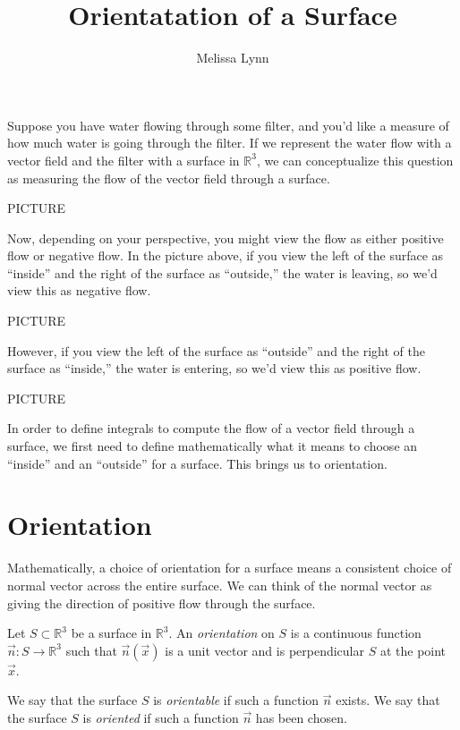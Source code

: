 \documentclass{ximera}
\title{Orientatation of a Surface}
\author{Melissa Lynn}
\begin{document}
  
\begin{abstract}  
\end{abstract}  
\maketitle  

Suppose you have water flowing through some filter, and you'd like a measure of how much water is going through the filter. If we represent the water flow with a vector field and the filter with a surface in $\mathbb{R}^3$, we can conceptualize this question as measuring the flow of the vector field through a surface.

PICTURE

Now, depending on your perspective, you might view the flow as either positive flow or negative flow. In the picture above, if you view the left of the surface as ``inside'' and the right of the surface as ``outside,'' the water is leaving, so we'd view this as negative flow.

PICTURE

However, if you view the left of the surface as ``outside'' and the right of the surface as ``inside,'' the water is entering, so we'd view this as positive flow.

PICTURE

In order to define integrals to compute the flow of a vector field through a surface, we first need to define mathematically what it means to choose an ``inside'' and an ``outside'' for a surface. This brings us to orientation.

\section*{Orientation}

Mathematically, a choice of orientation for a surface means a consistent choice of normal vector across the entire surface. We can think of the normal vector as giving the direction of positive flow through the surface.

\begin{definition}
Let $S\subset\mathbb{R}^3$ be a surface in $\mathbb{R}^3$. An \emph{orientation} on $S$ is a continuous function $\vec{n}:S\rightarrow\mathbb{R}^3$ such that $\vec{n}(\vec{x})$ is a unit vector and is perpendicular $S$ at the point $\vec{x}$.

We say that the surface $S$ is \emph{orientable} if such a function $\vec{n}$ exists. We say that the surface $S$ is \emph{oriented} if such a function $\vec{n}$ has been chosen.
\end{definition}
\end{document}
